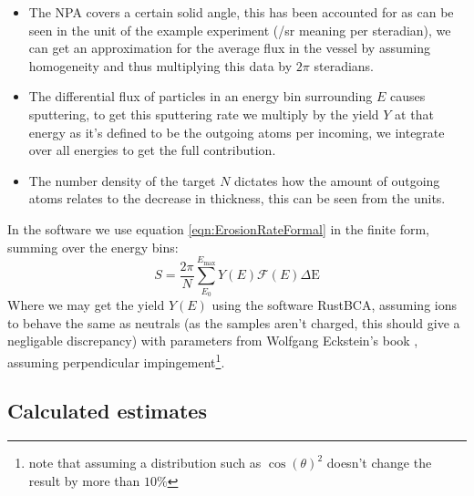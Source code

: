 \documentclass{article}
\begin{document}
\begin{itemize}
    \item The NPA covers a certain solid angle, this has been accounted for as
        can be seen in the unit of the example experiment (/sr meaning per
        steradian), we can get an approximation for the average
        flux in the vessel by assuming homogeneity and thus multiplying this
data by $2\pi$ steradians. 
    \item The differential flux of particles in an energy bin surrounding $E$ causes sputtering, to get this
        sputtering rate we multiply by the yield $Y$ at that energy as it's defined to be the
        outgoing atoms per incoming, we integrate over all energies to get the
        full contribution. 
    \item The number density of the target $N$ dictates how the amount of
        outgoing atoms relates to the decrease in thickness, this can be seen from the units.
\end{itemize}
In the software we use equation \ref{eqn:ErosionRateFormal} in the finite form,
summing over the energy bins:
\begin{equation}
S = \frac{2\pi}{N}\sum_{E_0}^{E_{\text{max}}} Y(E)\mathcal{F}(E)\Delta\text{E}
    \label{eqn:ErosionRateFinite}
\end{equation}
Where we may get the yield $Y(E)$ using the software RustBCA\cite{RustBCA},
assuming ions to behave the same as neutrals (as the samples aren't charged,
this should give a negligable discrepancy) with parameters from Wolfgang Eckstein's
book \cite{eckstein2013computer}, assuming perpendicular impingement\footnote{note that
assuming a distribution such as $\cos(\theta)^2$ doesn't change the result by more than $10\%$}.
\subsection{Calculated estimates}



\end{document}
